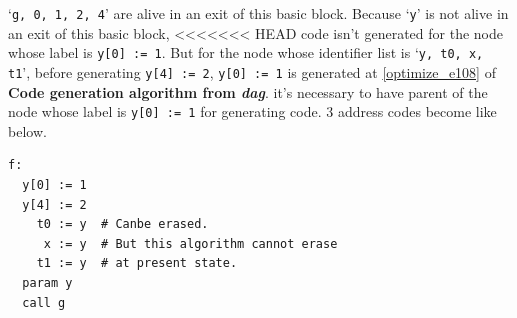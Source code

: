 \begin{Example}
`{\tt{g, 0, 1, 2, 4}}' are alive in an exit of this basic block.
Because `{\tt{y}}' is not alive in an exit of this basic block,
<<<<<<< HEAD
code isn't generated for the node whose label is {\tt{y[0] := 1}}. 
But for the node whose identifier list is `{\tt{y, t0, x, t1}}',
before generating {\tt{y[4] := 2}},
{\tt{y[0] := 1}} is generated at \ref{optimize_e108} of
{\bf Code generation algorithm from {\em dag}}.
it's necessary to have parent of the node whose label is {\tt{y[0] := 1}}
for generating code.
3 address codes become like below.
\begin{verbatim}
f:
  y[0] := 1
  y[4] := 2
    t0 := y  # Canbe erased.
     x := y  # But this algorithm cannot erase
    t1 := y  # at present state.
  param y
  call g
\end{verbatim}
\end{Example}


